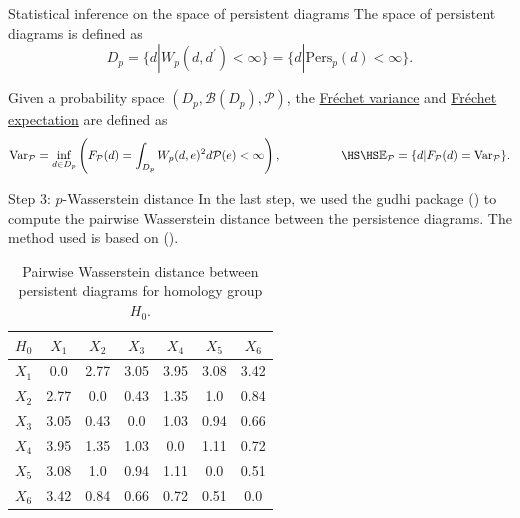 \documentclass[xcolor={dvipsnames,svgnames}]{beamer}
\begin{document}
\begin{frame}{Statistical inference on the space of persistent diagrams}
The space of persistent diagrams is defined as $$D_p = \{d | W_p(d,d^\prime)<\infty\} = \{d | \text{Pers}_p(d)<\infty\}.$$
     
     
     Given a probability space $(D_p, \mathcal{B}(D_p), \mathcal{P})$, the \uline{Fr\'echet variance} and \uline{Fr\'echet expectation} are defined as 
    $$\text{Var}_{\mathcal{P}}= \inf_{d\in D_p}\left( F_\mathcal{P}(d) = \int_{D_p}^{} W_p(d,e)^2  d \mathcal{P}(e)<\infty\right), \\
    \quad\quad \quad \quad \quad \HS\HS \mathbb{E}_\mathcal{P} = \{d | F_{\mathcal{P}}(d) =\text{Var}_\mathcal{P} \}.$$
\end{frame}
\begin{frame}{Step 3: $p$-Wasserstein distance}
In the last step, we used the gudhi package (\cite{gudhi:urm}) to compute the pairwise Wasserstein distance between the persistence diagrams. The method used is based on (\cite{kerber_geometry_2016}). 
\begin{table}[!htbp]
        \centering
        \small
        \setlength\tabcolsep{5pt}
        \begin{tabular}{|c|c|c|c|c|c|c|}
\hline
 $H_0$& $X_1$ & $X_2$ & $X_3$ & $X_4$ & $X_5$ & $X_6$\\
 \hline
$X_1$ &
0.0&
2.77&
3.05&
3.95&
3.08&
3.42
\\
\hline
$X_2$ &
2.77&
0.0&
0.43&
1.35&
1.0&
0.84
\\
\hline
$X_3$ &
3.05&
0.43&
0.0&
1.03&
0.94&
0.66
\\
\hline
$X_4$ &
3.95&
1.35&
1.03&
0.0&
1.11&
0.72
\\
\hline
$X_5$ &
3.08&
1.0&
0.94&
1.11&
0.0&
0.51
\\
\hline
$X_6$ &
3.42&
0.84&
0.66&
0.72&
0.51&
0.0
\\
\hline
\end{tabular}
\caption{\scriptsize Pairwise Wasserstein distance between persistent diagrams for homology group $H_0$.}
\label{tab:Wass_H0}
\end{table}
\end{frame}
\end{document}
